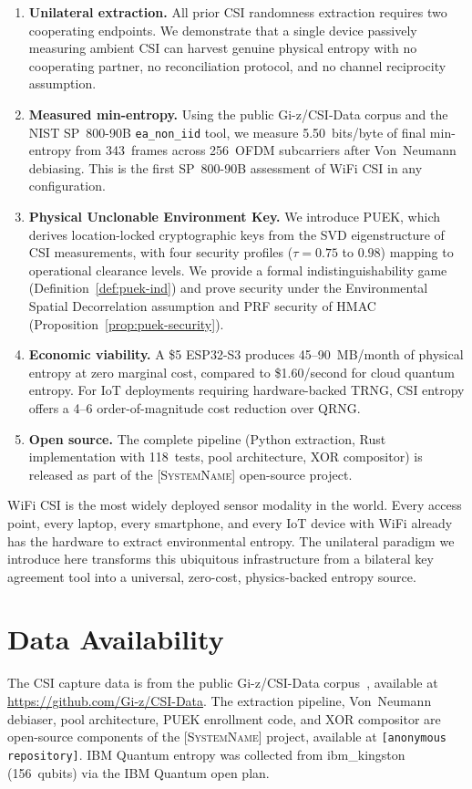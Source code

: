 \documentclass[sigconf,nonacm=false,anonymous]{acmart}
\newcommand{\zipminator}{\textsc{[SystemName]}\xspace}
\begin{document}
\begin{enumerate}
\item \textbf{Unilateral extraction.}
All prior CSI randomness extraction requires two cooperating endpoints.
We demonstrate that a single device passively measuring ambient CSI can harvest genuine physical entropy with no cooperating partner, no reconciliation protocol, and no channel reciprocity assumption.

\item \textbf{Measured min-entropy.}
Using the public Gi-z/CSI-Data corpus and the NIST SP~800-90B \texttt{ea\_non\_iid} tool, we measure 5.50~bits/byte of final min-entropy from 343~frames across 256~OFDM subcarriers after Von~Neumann debiasing.
This is the first SP~800-90B assessment of WiFi CSI in any configuration.

\item \textbf{Physical Unclonable Environment Key.}
We introduce PUEK, which derives location-locked cryptographic keys from the SVD eigenstructure of CSI measurements, with four security profiles ($\tau = 0.75$ to $0.98$) mapping to operational clearance levels.
We provide a formal indistinguishability game (Definition~\ref{def:puek-ind}) and prove security under the Environmental Spatial Decorrelation assumption and PRF security of HMAC (Proposition~\ref{prop:puek-security}).

\item \textbf{Economic viability.}
A \$5 ESP32-S3 produces 45--90~MB/month of physical entropy at zero marginal cost, compared to \$1.60/second for cloud quantum entropy.
For IoT deployments requiring hardware-backed TRNG, CSI entropy offers a 4--6 order-of-magnitude cost reduction over QRNG.

\item \textbf{Open source.}
The complete pipeline (Python extraction, Rust implementation with 118~tests, pool architecture, XOR compositor) is released as part of the \zipminator open-source project.
\end{enumerate}

WiFi CSI is the most widely deployed sensor modality in the world.
Every access point, every laptop, every smartphone, and every IoT device with WiFi already has the hardware to extract environmental entropy.
The unilateral paradigm we introduce here transforms this ubiquitous infrastructure from a bilateral key agreement tool into a universal, zero-cost, physics-backed entropy source.

\section*{Data Availability}
The CSI capture data is from the public Gi-z/CSI-Data corpus~\cite{gringoli2019csidata}, available at \url{https://github.com/Gi-z/CSI-Data}.
The extraction pipeline, Von~Neumann debiaser, pool architecture, PUEK enrollment code, and XOR compositor are open-source components of the \zipminator project, available at \texttt{[anonymous repository]}.
IBM Quantum entropy was collected from ibm\_kingston (156~qubits) via the IBM Quantum open plan.
\end{document}
